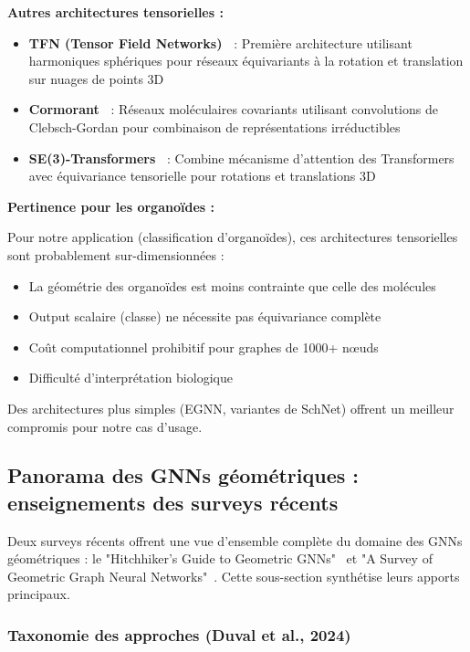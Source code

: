 \textbf{Autres architectures tensorielles :}
\begin{itemize}
    \item \textbf{TFN (Tensor Field Networks)~\cite{Thomas2018}} : Première architecture utilisant harmoniques sphériques pour réseaux équivariants à la rotation et translation sur nuages de points 3D
    \item \textbf{Cormorant~\cite{Anderson2019}} : Réseaux moléculaires covariants utilisant convolutions de Clebsch-Gordan pour combinaison de représentations irréductibles
    \item \textbf{SE(3)-Transformers~\cite{Fuchs2020}} : Combine mécanisme d'attention des Transformers avec équivariance tensorielle pour rotations et translations 3D
\end{itemize}

\textbf{Pertinence pour les organoïdes :}

Pour notre application (classification d'organoïdes), ces architectures tensorielles sont probablement sur-dimensionnées :
\begin{itemize}
    \item La géométrie des organoïdes est moins contrainte que celle des molécules
    \item Output scalaire (classe) ne nécessite pas équivariance complète
    \item Coût computationnel prohibitif pour graphes de 1000+ nœuds
    \item Difficulté d'interprétation biologique
\end{itemize}

Des architectures plus simples (EGNN, variantes de SchNet) offrent un meilleur compromis pour notre cas d'usage.

\subsection{Panorama des GNNs géométriques : enseignements des surveys récents}

Deux surveys récents offrent une vue d'ensemble complète du domaine des GNNs géométriques : le "Hitchhiker's Guide to Geometric GNNs"~\cite{Duval2024} et "A Survey of Geometric Graph Neural Networks"~\cite{Han2024}. Cette sous-section synthétise leurs apports principaux.

\subsubsection{Taxonomie des approches (Duval et al., 2024)}

